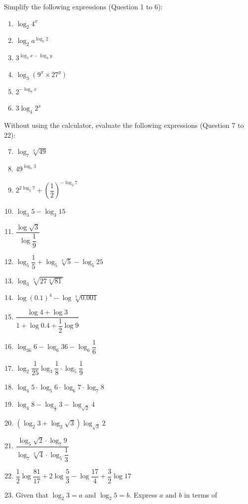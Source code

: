 \documentclass[12pt]{report}
\begin{document}
\setlength{\columnseprule}{1pt}
\setlength{\columnsep}{24pt}
\begin{multicols}{2}
  Simplify the following expressions (Question 1 to 6):
  \begin{enumerate}
    \item $\log_2 4^x$
    \item $\log_2 {a^{\log_a 2}}$
    \item $3^{\log_3 x - \log_3 y}$
    \item $\log_3 {(9^x \times 27^y)}$
    \item $2^{-\log_8 x}$
    \item $3\log_4 2^x$
  \end{enumerate}
  Without using the calculator, evaluate the following expressions (Question 7 to 22):
  \begin{enumerate}
    \setcounter{enumi}{6}
    \item $\log_7{\sqrt[3]{49}}$
    \item $49^{\log_7 3}$
    \item $2^{2\log_2 7}+\left({\dfrac{1}{2}}\right)^{-\log_2 7}$
    \item $\log_{3}5-\log_{3} 15$
    \item $\dfrac{\log{\sqrt{3}}}{\log{\dfrac{1}{9}}}$
    \item $\log_{5}{\dfrac{1}{5}}+\log_{5}{{\sqrt[3]{5}}-\log_{5}25}$
    \item $\log_{3}{\sqrt[3]{27{\sqrt[4]{81}}}}$
    \item $\log\left(0.1\right)^{4}-\log{\sqrt[3]{0.001}}$
    \item $\dfrac{\log4+\log3}{1+\log0.4+{\dfrac{1}{2}}\log9}$
    \item $\log_{36}6-\log_{6}36-\log_{6}{\dfrac{1}{6}}$
    \item $\log_{2}{\dfrac{1}{25}}\log_{3}{\dfrac{1}{8}}\cdot\log_{5}{\dfrac{1}{9}}$
    \item $\log_{4}5\cdot\log_{5}6\cdot\log_{6}7\cdot\log_{7}8$
    \item $\log_{4}8-\log_{\frac{1}{9}}3-\log_{\sqrt{2}}4$
    \item $\left(\log_{2}3+\log_{2}{\sqrt{3}}\right)\log_{\sqrt{3}}2$
    \item $\dfrac{\log_{5}\sqrt{2}\cdot\log_{7}9}{\log_{7}\sqrt[3]{4}\cdot\log_{5}{\dfrac{1}{3}}}$
    \item ${\dfrac{1}{2}}\log{\dfrac{81}{17}}+2\log{\dfrac{5}{3}}-\log{\dfrac{17}{4}}+{\dfrac{3}{2}}\log17$
    \item Given that $\log_2 3 = a$ and $\log_2 5 = b$. Express $a$ and $b$ in terms of

\end{enumerate}
\end{multicols}
\end{document}
